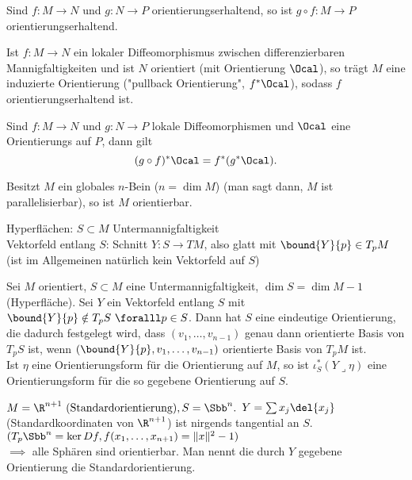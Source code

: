 \begin{rem*}
	Sind \( f: M \to N \) und \( g: N \to P \) orientierungserhaltend, so ist \( g \circ f: M \to P \) orientierungserhaltend.
\end{rem*}

\begin{lem}
	Ist \( f:M \to N \) ein lokaler Diffeomorphismus zwischen differenzierbaren Mannigfaltigkeiten und ist $N$ orientiert (mit Orientierung $\Ocal$), so trägt $M$ eine induzierte Orientierung ("pullback Orientierung", $f^*\Ocal$), sodass $f$ orientierungserhaltend ist.
\end{lem}

\begin{rem}
	Sind $f:M \to N$ und $g: N \to P$ lokale Diffeomorphismen und $\Ocal$ eine Orientierungs auf $P$, dann gilt
	\[ (g\circ f) ^* \Ocal = f^*(g^*\Ocal). \]
\end{rem}

\begin{lem}
	Besitzt $M$ ein globales $n$-Bein ($n = \dim M$) (man sagt dann, $M$ ist parallelisierbar), so ist $M$ orientierbar.
\end{lem}

\noindent Hyperflächen: \( S \subset M \) Untermannigfaltigkeit\\
Vektorfeld entlang $S$: Schnitt \( Y: S \to TM \), also glatt mit \( \bound{Y}{p} \in T_pM \) (ist im Allgemeinen natürlich kein Vektorfeld auf $S$)

\begin{lem}\label{8.14}
	Sei $M$ orientiert, \( S \subset M \) eine Untermannigfaltigkeit, \( \dim S = \dim M - 1 \) (Hyperfläche). Sei \( Y \) ein Vektorfeld entlang $S$ mit \( \bound{Y}{p} \notin T_pS\ \foralll p \in S \). Dann hat $S$ eine eindeutige Orientierung, die dadurch festgelegt wird, dass \( (v_1, \dotsc, v_{n-1}) \) genau dann orientierte Basis von $T_pS$ ist, wenn \( (\bound{Y}{p},v_1,\dotsc,v_{n-1}) \) orientierte Basis von $T_pM$ ist.\\
	Ist $\eta$ eine Orientierungsform für die Orientierung auf $M$, so ist \( \iota_S^*(Y \lrcorner \eta) \) eine Orientierungsform für die so gegebene Orientierung auf $S$.
\end{lem}

\begin{exmp*}
\end{exmp*}

\begin{exmp*}
	\( M = \R^{n+1} \ (\text{Standardorientierung}), S = \Sbb^n. \) \( Y = \sum x_j \del{x_j} \) (Standardkoordinaten von $\R^{n+1}$) ist nirgends tangential an $S$.\\
	\( ( T_p\Sbb^n = \ker Df, f(x_1,\dotsc,x_{n+1}) = \|x\|^2-1) \)\\
	$\implies$ alle Sphären sind orientierbar. Man nennt die durch $Y$ gegebene Orientierung die Standardorientierung.
\end{exmp*}

